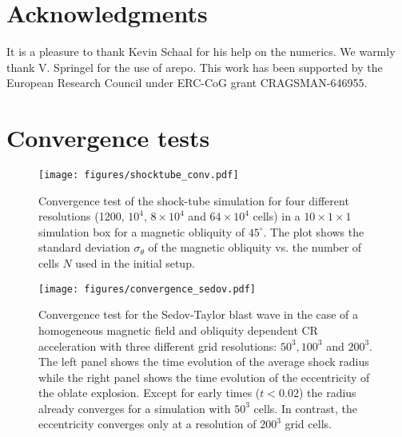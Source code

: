 \documentclass[8pt,a4paper,usenatbib]{mnras}
\newcommand{\AREPO}{{\sc arepo}\xspace}
\begin{document}
\section{Acknowledgments}
It is a pleasure to thank Kevin Schaal for his help on the numerics.  We warmly
thank V. Springel for the use of \AREPO.  This work has been supported by the
European Research Council under ERC-CoG grant CRAGSMAN-646955.




\newpage

\appendix


\section{Convergence tests}
\label{sec:convergence}

\begin{figure}
\centering
\texttt{[image: figures/shocktube\_conv.pdf]}
\caption{Convergence test of the shock-tube simulation for four different
  resolutions (1200, $10^4$, $8\times 10^4$ and $64 \times 10^4$ cells) in a $10 \times 1 \times 1$
  simulation box for a magnetic obliquity of $45^\circ$. The plot shows the
  standard deviation $\sigma_{\theta}$ of the magnetic obliquity vs. the number of
  cells $N$ used in the initial setup.}
\label{figC1:convergence_shocktube}
\end{figure}

\begin{figure*}
\centering
\texttt{[image: figures/convergence\_sedov.pdf]}
\caption{Convergence test for the Sedov-Taylor blast wave in the case of a homogeneous
  magnetic field and obliquity dependent CR acceleration with three different
  grid resolutions: $50^3, 100^3$ and $200^3$. The left panel shows the time
  evolution of the average shock radius while the right panel shows the time
  evolution of the eccentricity of the oblate explosion.  Except for early times
  ($t<0.02$) the radius already converges for a simulation with $50^3$ cells. In
  contrast, the eccentricity converges only at a resolution of $200^3$ grid
  cells.}
\label{figC2:convergence_sedov}
\end{figure*}
\end{document}
